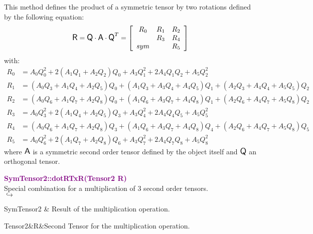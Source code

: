 This method defines the product of a symmetric tensor by two rotations defined by the following equation:
\begin{equation*}
\mbox{\large\ensuremath{\mathsf{R}}} = \mbox{\large\ensuremath{\mathsf{Q}}} \cdot \mbox{\large\ensuremath{\mathsf{A}}} \cdot \mbox{\large\ensuremath{\mathsf{Q}}}^T =\left[\begin{array}{ccc}
R_0 & R_1 & R_2\\
& R_3 & R_4\\
sym &  & R_5
\end{array}\right]
\end{equation*}
with:
\begin{align*}
R_0 & = A_0 Q_0^2 + 2 (A_1 Q_1 + A_2 Q_2)Q_0 + A_3 Q_1^2 + 2 A_4 Q_1 Q_2 + A_5 Q_2^2\\
R_1 & = (A_0 Q_3 + A_1 Q_4 + A_2 Q_5)Q_0 + (A_1 Q_3 + A_3 Q_4 + A_4 Q_5)Q_1 + (A_2 Q_3 + A_4 Q_4 + A_5 Q_5)Q_2\\
R_2 & = (A_0 Q_6 + A_1 Q_7 + A_2 Q_8)Q_0 + (A_1 Q_6 + A_3 Q_7 + A_4 Q_8)Q_1 + (A_2 Q_6 + A_4 Q_7 + A_5 Q_8)Q_2\\
R_3 & = A_0 Q_3^2 + 2 (A_1 Q_4 + A_2 Q_5)Q_3+ A_3 Q_4^2 + 2 A_4 Q_4 Q_5 + A_5 Q_5^2\\
R_4 & = (A_0 Q_6 + A_1 Q_7 + A_2 Q_8)Q_3 + (A_1 Q_6 + A_3 Q_7 + A_4 Q_8)Q_4 + (A_2 Q_6 + A_4 Q_7 + A_5 Q_8)Q_5\\
R_5 & = A_0 Q_6^2 + 2 (A_1 Q_7 + A_2 Q_8)Q_6+ A_3 Q_7^2 + 2 A_4 Q_7 Q_8 + A_5 Q_8^2
\end{align*}
where $\mbox{\large\ensuremath{\mathsf{A}}}$ is a symmetric second order tensor defined by the object itself and $\mbox{\large\ensuremath{\mathsf{Q}}}$ an orthogonal tensor.

\textcolor{purple}{\textbf{SymTensor2::dotRTxR(Tensor2 R)}}\label{SymTensor2::dotRTxR(Tensor2 R)}\\
Special combination for a multiplication of 3 second order tensors.\\ \hspace*{5mm}$\hookrightarrow$
\vspace*{-2em}\begin{tcolorbox}[grow to left by=-1cm, width=\textwidth-1cm,myArgs,tabularx={l|R}]
SymTensor2 & Result of the multiplication operation.
\end{tcolorbox}

\begin{tcolorbox}[width=\textwidth,myArgs,tabularx={ll|R}]
Tensor2&R&Second Tensor for the multiplication operation.
\end{tcolorbox}

